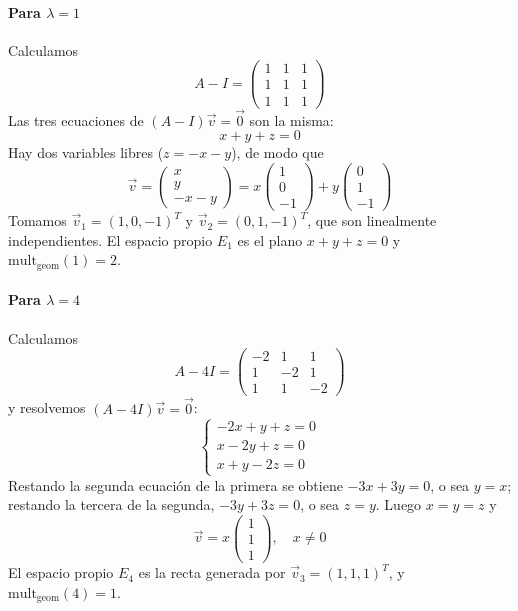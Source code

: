 \documentclass{article}
\newcommand{\vect}[1]{\vec{#1}}
\begin{document}
\paragraph*{Para \(\lambda=1\)}
Calculamos
\[
A-I=\begin{pmatrix}
1&1&1\\
1&1&1\\
1&1&1
\end{pmatrix}
\]
Las tres ecuaciones de \((A-I)\vect{v}=\vect{0}\) son la misma:
\[
x+y+z=0
\]
Hay dos variables libres (\(z=-x-y\)), de modo que
\[
\vect{v}=\begin{pmatrix}x\\y\\-x-y\end{pmatrix}
=x\begin{pmatrix}1\\0\\-1\end{pmatrix}+y\begin{pmatrix}0\\1\\-1\end{pmatrix}
\]
Tomamos \(\vect{v}_1=(1,0,-1)^T\) y \(\vect{v}_2=(0,1,-1)^T\), que son linealmente independientes. El espacio propio \(E_1\) es el plano \(x+y+z=0\) y \(\mathrm{mult}_{\mathrm{geom}}(1)=2\).

\paragraph*{Para \(\lambda=4\)}
Calculamos
\[
A-4I=\begin{pmatrix}
-2&1&1\\
1&-2&1\\
1&1&-2
\end{pmatrix}
\]
y resolvemos \((A-4I)\vect{v}=\vect{0}\):
\[
\begin{cases}
-2x+y+z=0\\
x-2y+z=0\\
x+y-2z=0
\end{cases}
\]
Restando la segunda ecuación de la primera se obtiene \(-3x+3y=0\), o sea \(y=x\); restando la tercera de la segunda, \(-3y+3z=0\), o sea \(z=y\). Luego \(x=y=z\) y
\[
\vect{v}=x\begin{pmatrix}1\\1\\1\end{pmatrix},
\quad x\neq0
\]
El espacio propio \(E_4\) es la recta generada por \(\vect{v}_3=(1,1,1)^T\), y \(\mathrm{mult}_{\mathrm{geom}}(4)=1\).
\end{document}
